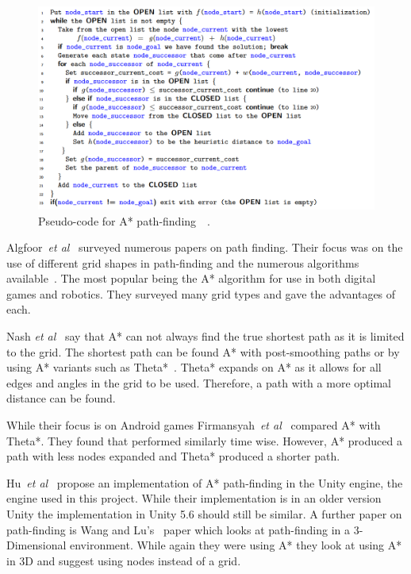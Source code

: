 \documentclass[journal]{IEEEtran}
\begin{document}
\begin{figure}[H]
	\includegraphics[width=1.0\linewidth]{APseudocode.png}
	\caption{Pseudo-code for A* path-finding~\cite{Hart1968}~\cite{pseudocode:A*}.}
	\label{A*Pseudo}
\end{figure} 

Algfoor~\textit{et al}~\cite{Algfoor2015} surveyed numerous papers on path finding. Their focus was on the use of different grid shapes in path-finding and the numerous algorithms available~\cite{Algfoor2015}. The most popular being the A* algorithm for use in both digital games and robotics. They surveyed many grid types and gave the advantages of each. 

Nash \textit{et al}~\cite{Nash2007} say that A* can not always find the true shortest path as it is limited to the grid. The shortest path can be found A* with post-smoothing paths or by using A* variants such as Theta*~\cite{Nash2007,Firmansyah2016}. Theta* expands on A* as it allows for all edges and angles in the grid to be used. Therefore, a path with a more optimal distance can be found.

While their focus is on Android games Firmansyah~\textit{et al}~\cite{Firmansyah2016} compared A* with Theta*. They found that performed similarly time wise. However, A* produced a path with less nodes expanded and Theta* produced a shorter path. 

Hu~\textit{et al}~\cite{Hu2012} propose an implementation of A* path-finding in the Unity engine, the engine used in this project.  While their implementation is in an older version Unity the implementation in Unity 5.6 should still be similar. A further paper on path-finding is Wang and Lu's~\cite{wang2012} paper which looks at path-finding in a 3-Dimensional environment. While again they were using A* they look at using A* in 3D and suggest using nodes instead of a grid.
\end{document}
